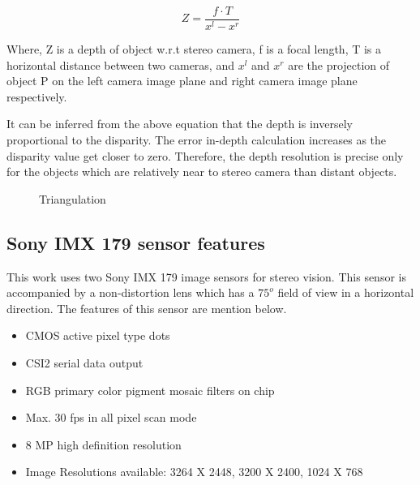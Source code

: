 \begin{equation}
Z = \frac{f \cdot T}{x^l - x^r}
\label{triangulation}
\end{equation}

Where, Z is a depth of object w.r.t stereo camera, f is a focal length, T is a horizontal distance between two cameras, and $x^l$ and $x^r$ are the projection of object P on the left camera image plane and right camera image plane respectively. 

It can be inferred from the above equation that the depth is inversely proportional to the disparity. The error in-depth calculation increases as the disparity value get closer to zero. Therefore, the depth resolution is precise only for the objects which are relatively near to stereo camera than distant objects. 

\begin{figure}
    \centering
    \caption{Triangulation \cite{opencv}}
    \label{triangulate}
\end{figure}

\subsection{Sony IMX 179 sensor features}
This work uses two Sony IMX 179 image sensors for stereo vision. This sensor is accompanied by a non-distortion lens which has a $75^o$ field of view in a horizontal direction. The features of this sensor are mention below.

\begin{itemize}
\item CMOS active pixel type dots
\item CSI2 serial data output
\item RGB primary color pigment mosaic filters on chip
\item Max. 30 fps in all pixel scan mode
\item 8 MP high definition resolution 
\item Image Resolutions available: 3264 X 2448, 3200 X 2400, 1024 X 768
\end{itemize}

